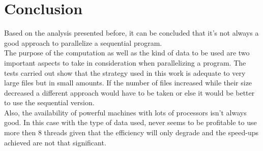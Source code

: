 \documentclass[10pt,journal,compsoc]{IEEEtran}
\begin{document}
\section{Conclusion}
Based on the analysis presented before, it can be concluded that it's not always a good approach to parallelize a sequential program. 
\\
The purpose of the computation as well as the kind of data to be used are two important aspects to take in consideration when parallelizing a program. The tests carried out show that the strategy used in this work is adequate to very large files but in small amounts. If the number of files increased while their size decreased a different approach would have to be taken or else it would be better to use the sequential version.
\\
Also, the availability of powerful machines with lots of processors isn't always good. In this case with the type of data used, never seems to be profitable to use more then 8 threads given that the efficiency will only degrade and the speed-ups achieved are not that significant.






%



\end{document}
